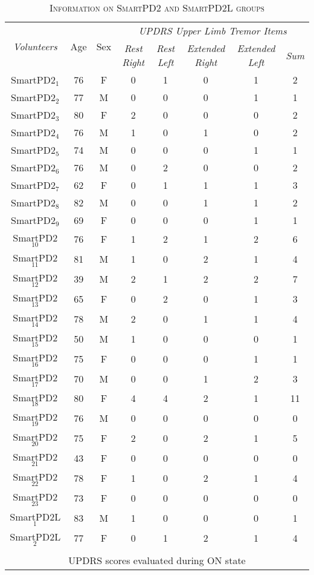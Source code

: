 \begin{table}[!hp]
\centering
\caption{\textsc{Information on SmartPD2 and SmartPD2L groups}}
\begin{tabular*}{1\textwidth}{@{\extracolsep{\fill}} c c c c c c c c}
	\multirow{2}{*}{\textit{Volunteers}} & \multirow{2}{*}{Age} & \multirow{2}{*}{Sex} 
	& \multicolumn{5}{c}{\textit{UPDRS Upper Limb Tremor Items}} \\
	\cline{4-8}
	& & & \textit{Rest Right} & \textit{Rest Left} & \textit{Extended Right} & \textit{Extended Left} & \textit{Sum}\\
	\cline{1-8}
 	\gls{SmartPD2}$_{1}$ & 76 & F & 0 & 1 & 0 & 1 & 2\\
 	\gls{SmartPD2}$_{2}$ & 77 & M & 0 & 0 & 0 & 1 & 1\\
 	\gls{SmartPD2}$_{3}$ & 80 & F & 2 & 0 & 0 & 0 & 2\\
 	\gls{SmartPD2}$_{4}$ & 76 & M & 1 & 0 & 1 & 0 & 2\\
 	\gls{SmartPD2}$_{5}$ & 74 & M & 0 & 0 & 0 & 1 & 1\\
 	\gls{SmartPD2}$_{6}$ & 76 & M & 0 & 2 & 0 & 0 & 2\\
 	\gls{SmartPD2}$_{7}$ & 62 & F & 0 & 1 & 1 & 1 & 3\\
 	\gls{SmartPD2}$_{8}$ & 82 & M & 0 & 0 & 1 & 1 & 2\\
 	\gls{SmartPD2}$_{9}$ & 69 & F & 0 & 0 & 0 & 1 & 1\\
 	\gls{SmartPD2}$_{10}$ & 76 & F & 1 & 2 & 1 & 2 & 6\\
 	\gls{SmartPD2}$_{11}$ & 81 & M & 1 & 0 & 2 & 1 & 4\\
 	\gls{SmartPD2}$_{12}$ & 39 & M & 2 & 1 & 2 & 2 & 7\\
 	\gls{SmartPD2}$_{13}$ & 65 & F & 0 & 2 & 0 & 1 & 3\\
 	\gls{SmartPD2}$_{14}$ & 78 & M & 2 & 0 & 1 & 1 & 4\\
 	\gls{SmartPD2}$_{15}$ & 50 & M & 1 & 0 & 0 & 0 & 1\\
 	\gls{SmartPD2}$_{16}$ & 75 & F & 0 & 0 & 0 & 1 & 1\\
 	\gls{SmartPD2}$_{17}$ & 70 & M & 0 & 0 & 1 & 2 & 3\\
 	\gls{SmartPD2}$_{18}$ & 80 & F & 4 & 4 & 2 & 1 & 11\\
 	\gls{SmartPD2}$_{19}$ & 76 & M & 0 & 0 & 0 & 0 & 0\\
 	\gls{SmartPD2}$_{20}$ & 75 & F & 2 & 0 & 2 & 1 & 5\\
 	\gls{SmartPD2}$_{21}$ & 43 & F & 0 & 0 & 0 & 0 & 0\\
 	\gls{SmartPD2}$_{22}$ & 78 & F & 1 & 0 & 2 & 1 & 4\\
 	\gls{SmartPD2}$_{23}$ & 73 & F & 0 & 0 & 0 & 0 & 0\\
	\cline{1-8}
 	\gls{SmartPD2L}$_{1}$ & 83 & M & 1 & 0 & 0 & 0 & 1\\
 	\gls{SmartPD2L}$_{2}$ & 77 & F & 0 & 1 & 2 & 1 & 4\\
 	& & & & & & &\\
	\multicolumn{8}{c}{\gls{UPDRS} scores evaluated during ON state} 	\\
\end{tabular*}
\label{table:demoSmartPD2}
\end{table}

